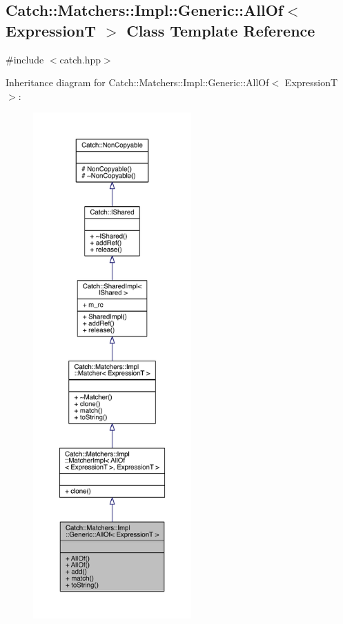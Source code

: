 \hypertarget{a00001}{}\subsection{Catch\+:\+:Matchers\+:\+:Impl\+:\+:Generic\+:\+:All\+Of$<$ Expression\+T $>$ Class Template Reference}
\label{a00001}


{\ttfamily \#include $<$catch.\+hpp$>$}



Inheritance diagram for Catch\+:\+:Matchers\+:\+:Impl\+:\+:Generic\+:\+:All\+Of$<$ Expression\+T $>$\+:\nopagebreak
\begin{figure}[H]
\begin{center}
\leavevmode
\includegraphics[height=550pt]{a00342}
\end{center}
\end{figure}


